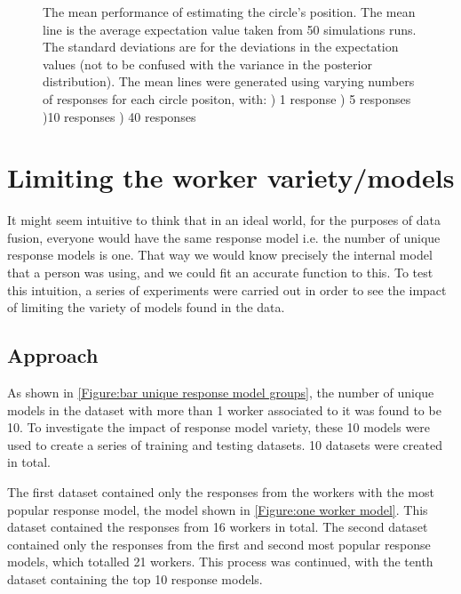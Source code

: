 \begin{figure}
\begin{subfigure}{6cm}
\caption{}
\label{Figure: response_estimate_40}
\end{subfigure}
\caption{The mean performance of estimating the circle's position. The mean line is the average expectation value taken from 50 simulations runs. The standard deviations are for the deviations in the expectation values (not to be confused with the variance in the posterior distribution). The mean lines were generated using varying numbers of responses for each circle positon, with: ) 1 response ) 5 responses )10 responses ) 40 responses}
\label{Figure: response_estimate}
\end{figure}





\section{Limiting the worker variety/models}

It might seem intuitive to think that in an ideal world, for the purposes of data fusion, everyone would have the same response model i.e. the number of unique response models is one. That way we would know precisely the internal model that a person was using, and we could fit an accurate function to this. To test this intuition, a series of experiments were carried out in order to see the impact of limiting the variety of models found in the data. 

\subsection{Approach}

As shown in \ref{Figure:bar unique response model groups}, the number of unique models in the dataset with more than 1 worker associated to it was found to be 10. To investigate the impact of response model variety, these 10 models were used to create a series of training and testing datasets. 10 datasets were created in total.

The first dataset contained only the responses from the workers with the most popular response model, the model shown in \ref{Figure:one worker model}. This dataset contained the responses from 16 workers in total. The second dataset contained only the responses from the first and second most popular response models, which totalled 21 workers. This process was continued, with the tenth dataset containing the top 10 response models.

